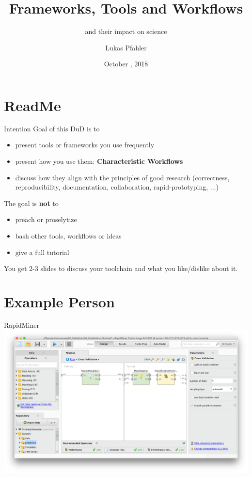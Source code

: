 \documentclass[aspectratio=169,10pt]{beamer}
\title{Frameworks, Tools and Workflows}
\subtitle{and their impact on science}
\date{October \nth{25}, 2018}
\author{Lukas Pfahler}
\institute{TU Dortmund University, Chair for Artificial Intelligence}
\begin{document}
\maketitle
\section{ReadMe}
\begin{frame}{Intention}
Goal of this DuD is to
\begin{itemize}
    \item present tools or frameworks you use frequently
    \item present how you use them: \textbf{Characteristic Workflows}
    \item discuss how they align with the principles of good research (correctness, reproducibility, documentation, collaboration, rapid-prototyping, ...)
\end{itemize}
The goal is \textbf{not} to
\begin{itemize}
    \item preach or proselytize
    \item bash other tools, workflows or ideas
    \item give a full tutorial
\end{itemize}
You get 2-3 slides to discuss your toolchain and what you like/dislike about it.
\end{frame}

\section{Example Person}
\begin{frame}[fragile]{RapidMiner}
\includegraphics[width=\linewidth]{rapidminer.png}
\end{frame}
\end{document}

